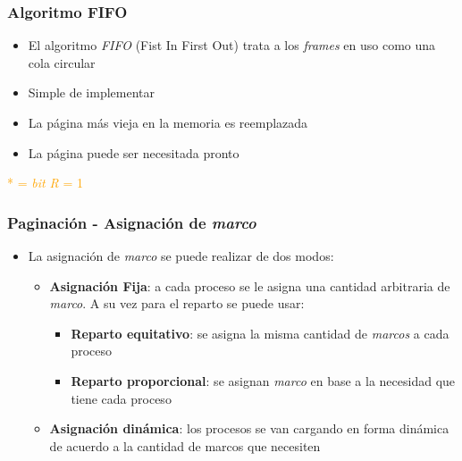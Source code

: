 \begin{frame}
  \frametitle{Algoritmo \textbf{FIFO}}
  \begin{itemize}
  	\item El algoritmo \emph{FIFO} (Fist In First Out) trata a los \emph{frames} en uso como una cola circular
	\item Simple de implementar
	\item La página más vieja en la memoria es reemplazada
	\item La página puede ser necesitada pronto
  \end{itemize}
  \begin{table}
	  \centering
  \end{table}
  \textcolor{orange}{* = \emph{bit R} = 1}
\end{frame}

\begin{frame}
  \frametitle{Paginación - Asignación de \emph{marco}}
  \begin{itemize}
  	\item La asignación de \emph{marco} se puede realizar de dos modos:
  	\begin{itemize}
  		\item \textbf{Asignación Fija}: a cada proceso se le asigna una cantidad arbitraria de \emph{marco}. A su vez para el reparto se puede usar:
  		\begin{itemize}
  			\item \textbf{Reparto equitativo}: se asigna la misma cantidad de \emph{marcos} a cada proceso
  			\item \textbf{Reparto proporcional}: se asignan \emph{marco} en base a la necesidad que tiene cada proceso
  		\end{itemize}
		\item \textbf{Asignación dinámica}: los procesos se van cargando en forma dinámica de acuerdo a la cantidad de marcos que necesiten		
  	\end{itemize}
  \end{itemize}
\end{frame}

